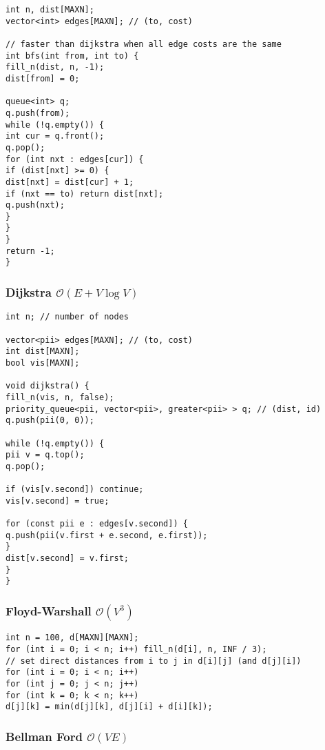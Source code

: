 \documentclass{article}
\begin{document}
\begin{lstlisting}
int n, dist[MAXN];
vector<int> edges[MAXN]; // (to, cost)

// faster than dijkstra when all edge costs are the same
int bfs(int from, int to) {
fill_n(dist, n, -1);
dist[from] = 0;

queue<int> q;
q.push(from);
while (!q.empty()) {
int cur = q.front();
q.pop();
for (int nxt : edges[cur]) {
if (dist[nxt] >= 0) {
dist[nxt] = dist[cur] + 1;
if (nxt == to) return dist[nxt];
q.push(nxt);
}
}
}
return -1;
}

\end{lstlisting}

\subsubsection{Dijkstra $\mathcal{O}(E + V \log V)$}

\begin{lstlisting}
int n; // number of nodes

vector<pii> edges[MAXN]; // (to, cost)
int dist[MAXN];
bool vis[MAXN];

void dijkstra() {
fill_n(vis, n, false);
priority_queue<pii, vector<pii>, greater<pii> > q; // (dist, id)
q.push(pii(0, 0));

while (!q.empty()) {
pii v = q.top();
q.pop();

if (vis[v.second]) continue;
vis[v.second] = true;

for (const pii e : edges[v.second]) {
q.push(pii(v.first + e.second, e.first));
}
dist[v.second] = v.first;
}
}
\end{lstlisting}

\subsubsection{Floyd-Warshall $\mathcal{O}(V^{3})$}

\begin{lstlisting}
int n = 100, d[MAXN][MAXN];
for (int i = 0; i < n; i++) fill_n(d[i], n, INF / 3);
// set direct distances from i to j in d[i][j] (and d[j][i])
for (int i = 0; i < n; i++)
for (int j = 0; j < n; j++)
for (int k = 0; k < n; k++)
d[j][k] = min(d[j][k], d[j][i] + d[i][k]);

\end{lstlisting}

\subsubsection{Bellman Ford $\mathcal{O}(V E)$}
\end{document}
